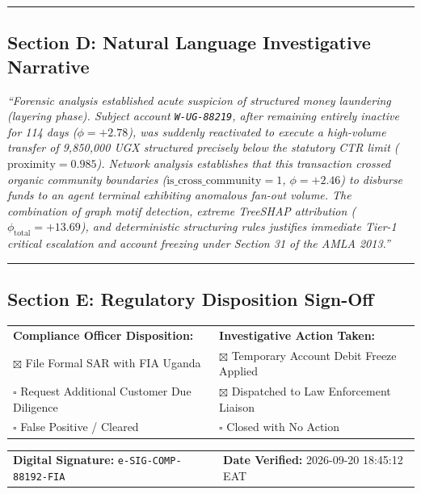 \begin{tcolorbox}[colback=gray!5,colframe=black!70,title=\textbf{FINANCIAL INTELLIGENCE AUTHORITY (UGANDA) --- SUSPICIOUS ACTIVITY REPORT (SAR)}]
\vspace{0.8em}
\hrule
\vspace{0.8em}

\subsection*{Section D: Natural Language Investigative Narrative}
\textit{``Forensic analysis established acute suspicion of structured money laundering (layering phase). Subject account \texttt{W-UG-88219}, after remaining entirely inactive for 114 days ($\phi = +2.78$), was suddenly reactivated to execute a high-volume transfer of 9,850,000 UGX structured precisely below the statutory CTR limit ($\text{proximity} = 0.985$). Network analysis establishes that this transaction crossed organic community boundaries ($\text{is\_cross\_community} = 1$, $\phi = +2.46$) to disburse funds to an agent terminal exhibiting anomalous fan-out volume. The combination of graph motif detection, extreme TreeSHAP attribution ($\phi_{\text{total}} = +13.69$), and deterministic structuring rules justifies immediate Tier-1 critical escalation and account freezing under Section 31 of the AMLA 2013.''}

\vspace{0.8em}
\hrule
\vspace{0.8em}

\subsection*{Section E: Regulatory Disposition Sign-Off}
\begin{tabular}{@{}p{6.8cm}p{7.2cm}@{}}
\textbf{Compliance Officer Disposition:} & \textbf{Investigative Action Taken:} \\
$\boxtimes$ File Formal SAR with FIA Uganda & $\boxtimes$ Temporary Account Debit Freeze Applied \\
$\square$ Request Additional Customer Due Diligence & $\boxtimes$ Dispatched to Law Enforcement Liaison \\
$\square$ False Positive / Cleared & $\square$ Closed with No Action \\
\end{tabular}

\vspace{1.2em}
\noindent
\begin{tabular}{@{}p{6.8cm}p{7.2cm}@{}}
\textbf{Digital Signature:} \texttt{e-SIG-COMP-88192-FIA} & \textbf{Date Verified:} 2026-09-20 18:45:12 EAT \\
\end{tabular}
\end{tcolorbox}

